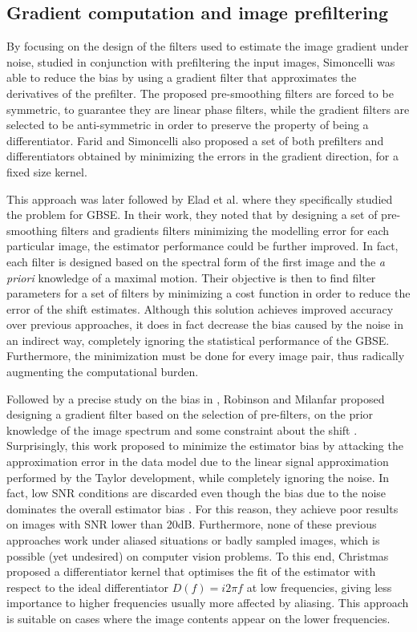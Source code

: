 \subsection{Gradient computation and image prefiltering}
\label{sec:gradEstimationGBSE}
By focusing on the design of the filters used to estimate the image gradient under noise, studied in conjunction with prefiltering the input images, Simoncelli \cite{Simoncelli_1994} was able to reduce the bias by using a gradient filter that approximates the derivatives of the prefilter. The proposed pre-smoothing filters are forced to be symmetric, to guarantee they are linear phase filters, while the gradient filters are selected to be anti-symmetric in order to preserve the property of being a differentiator. Farid and Simoncelli \cite{farid2004differentiation} also proposed a set of both prefilters and differentiators obtained by minimizing the errors in the gradient direction, for a fixed size kernel. 

This approach was later followed by Elad et al. \cite{Elad_1999} where they specifically studied the problem for GBSE. In their work, they noted that by designing a set of pre-smoothing filters and gradients filters minimizing the modelling error for each particular image, the estimator performance could be further improved. In fact, each filter is designed based on the spectral form of the first image and the \emph{a priori} knowledge of a maximal motion. Their objective is then to find filter parameters for a set of filters by minimizing a cost function in order to reduce the error of the shift estimates. Although this solution achieves improved accuracy over previous approaches, it does in fact decrease the bias caused by the noise in an indirect way, completely ignoring the statistical performance of the GBSE. Furthermore, the minimization must be done for every image pair, thus radically augmenting the computational burden.

Followed by a precise study on the bias in \cite{Robinson2004}, Robinson and Milanfar proposed designing a gradient filter based on the selection of pre-filters, on the prior knowledge of the image spectrum and some constraint about the shift \cite{Robinson2005}. Surprisingly, this work proposed to minimize the estimator bias by attacking the approximation error in the data model due to the linear signal approximation performed by the Taylor development, while completely ignoring the noise. In fact, low SNR conditions are discarded even though the bias due to the noise dominates the overall estimator bias \cite{pham2005performance}. For this reason, they achieve poor results on images with SNR lower than 20dB. Furthermore, none of these previous approaches work under aliased situations or badly sampled images, which is possible (yet undesired) on computer vision problems. To this end, Christmas \cite{christmas1998spatial} proposed a differentiator kernel that optimises the fit of the estimator with respect to the ideal differentiator $D(f) = i2\pi f$ at low frequencies,  giving less importance to  higher frequencies usually more affected by aliasing. This approach is suitable on cases where the  image contents appear on the lower frequencies.

